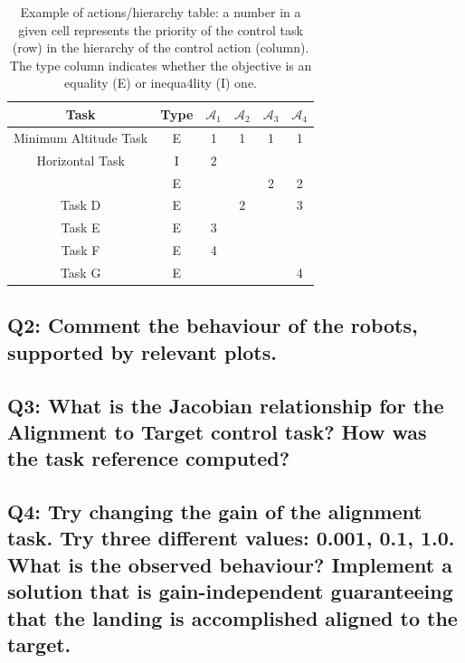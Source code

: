 \documentclass{article}
\begin{document}
\begin{table}[htb]
	\caption{Example of actions/hierarchy table: a number in a given cell represents the priority of the control task (row) in the hierarchy of the control action (column). The type column indicates whether the objective is an equality (E) or inequa4lity (I) one.}
	\label{tbl:actions_tables}
	\begin{center}
		\footnotesize
		\begin{tabular}{cccccc}
			\toprule		
			Task & Type & $\mathcal{A}_{1}$ & $\mathcal{A}_{2}$ & $\mathcal{A}_{3} $ & $\mathcal{A}_{4} $ \\
			\midrule
			Minimum Altitude Task                    & E & 1 & 1 & 1 & 1  \\
			\hdashline
			Horizontal Task                & I & 2 &  & &  \\
			\hdashline
			                       & E &   &  & 2 & 2   \\
			\hdashline
			Task D 						& E & & 2 & & 3 \\
			\hdashline
			Task E     					& E & 3 & & & \\
			\hdashline
			Task F 						& E & 4 & & & \\
			\hdashline 
			Task G 						& E & & & & 4 \\ 
			
			\bottomrule
		\end{tabular}
	\end{center}
\end{table}%
\subsection{Q2: Comment the behaviour of the robots, supported by relevant plots.}

\subsection{Q3: What is the Jacobian relationship for the Alignment to Target control task? How was the task reference computed?}

\subsection{Q4: Try changing the gain of the alignment task. Try three different values: 0.001, 0.1, 1.0. What is the observed behaviour? Implement a solution that is gain-independent guaranteeing that the landing is accomplished aligned to the target.}
\end{document}
